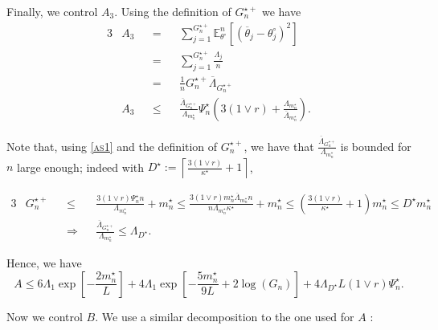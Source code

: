 \medskip

Finally, we control $A_{3}.$
Using the definition of $G_{n}^{\star+}$ we have
\begin{alignat*}{3}
& A_{3} && = && \sum\limits_{j = 1}^{G_{n}^{\star+}} \mathds{E}_{\theta^{\circ}}^{n}\left[\left(\overline{\theta}_{j} - \theta^{\circ}_{j}\right)^{2}\right]\\
& && = && \sum\limits_{j = 1}^{G_{n}^{\star+}} \frac{\Lambda_{j}}{n}\\
& && = && \frac{1}{n} G_{n}^{\star+} \overline{\Lambda}_{G_{n}^{\star+}}\\
& A_{3} && \leq && \frac{\overline{\Lambda}_{G_{n}^{\star+}}}{\Lambda_{m_{n}^{\star}}} \Psi_{n}^{\star} \left(3 \left(1 \vee r\right) + \frac{\Lambda_{m_{n}^{\star}}}{\overline{\Lambda}_{m_{n}^{\star}}}\right).
\end{alignat*}

Note that, using \textsc{\cref{as1}} and the definition of $G_{n}^{\star+}$, we have that $\frac{\overline{\Lambda}_{G_{n}^{\star+}}}{\Lambda_{m_{n}^{\star}}}$ is bounded for $n$ large enough; indeed with $D^{\star} := \left\lceil \frac{3 \left( 1 \vee r \right) }{\kappa^{\star}} + 1\right\rceil$,

\begin{alignat*}{3}
& G_{n}^{\star+} && \leq && \frac{3 \left(1 \vee r \right) \Psi_{n}^{\star} n}{\Lambda_{m_{n}^{\star}}} + m_{n}^{\star} \leq \frac{3 \left(1 \vee r \right) m_{n}^{\star} \overline{\Lambda}_{m_{n}^{\star}} n}{ n\Lambda_{m_{n}^{\star}} \kappa^{\star}} + m_{n}^{\star} \leq \left(\frac{3\left(1 \vee r \right)}{\kappa^{\star}} + 1\right) m_{n}^{\star} \leq D^{\star} m_{n}^{\star}\\ 
& && \Rightarrow && \frac{\overline{\Lambda}_{G_{n}^{\star+}}}{\Lambda_{m_{n}^{\star}}}\leq \Lambda_{D^{\star}}.
\end{alignat*}

\medskip

Hence, we have
\[A \leq 6 \Lambda_{1} \exp\left[- \frac{2 m_{n}^{\star}}{L}\right] + 4 \Lambda_{1} \exp\left[-\frac{5 m_{n}^{\star}}{9 L} + 2 \log \left(G_{n}\right)\right] +  4 \Lambda_{D^{\star}} L \left(1 \vee r\right) \Psi_{n}^{\star}.\]

\bigskip

Now we control $B$.
We use a similar decomposition to the one used for $A$ :

